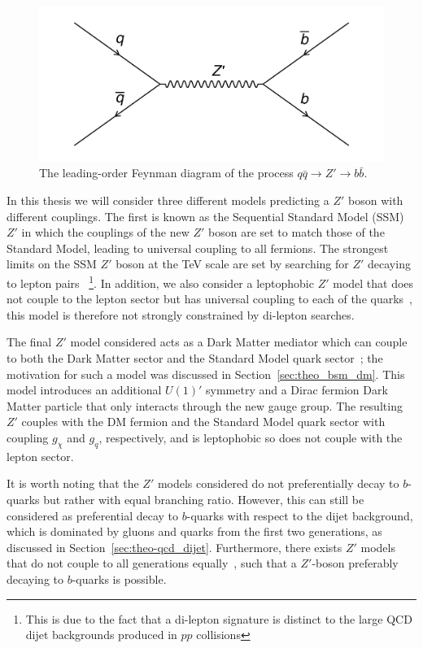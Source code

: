 \begin{figure}[!hbt]
  \begin{center}
    \includegraphics[width=0.7\linewidth, angle=0]{figs/Theory/bsm_zprime.png}
  \end{center}
  \caption{The leading-order Feynman diagram of the process $q\bar{q} \to Z' \to b\bar{b}$.}
  \label{fig:theo-bsm_zprime}
\end{figure}

In this thesis we will consider three different models predicting a $Z'$ boson with different couplings.
The first is known as the Sequential Standard Model (SSM) $Z'$ in which the couplings
of the new $Z'$ boson are set to match those of the Standard Model, leading to universal coupling to all fermions.
The strongest limits on the SSM $Z'$ boson at the TeV scale are set by searching for $Z'$ decaying to lepton pairs~\cite{theo-bsm_dilep}
\footnote{This is due to the fact that a di-lepton signature is distinct to the large QCD dijet backgrounds produced in $pp$ collisions}.
In addition, we also consider a leptophobic $Z'$ model that does not couple to the lepton sector
but has universal coupling to each of the quarks~\cite{theo-bsm_zprime_leptophobic},
this model is therefore not strongly constrained by di-lepton searches.

The final $Z'$ model considered acts as a Dark Matter mediator which can couple to both the Dark Matter sector and the Standard Model quark sector~\cite{theo_bsm-zprime_dm};
the motivation for such a model was discussed in Section~\ref{sec:theo_bsm_dm}.
This model introduces an additional $U(1)'$ symmetry and a Dirac fermion Dark Matter particle that only interacts through the new gauge group.
The resulting $Z'$ couples with the DM fermion and the Standard Model quark sector with coupling $g_\chi$\hspace{0.1mm} and $g_q$\hspace{0.1mm}, respectively,
and is leptophobic so does not couple with the lepton sector.

It is worth noting that the $Z'$ models considered do not preferentially decay to $b$-quarks but rather with equal branching ratio.
However, this can still be considered as preferential decay to $b$-quarks with respect to the dijet background,
which is dominated by gluons and quarks from the first two generations, as discussed in Section~\ref{sec:theo-qcd_dijet}.
Furthermore, there exists $Z'$ models that do not couple to all generations equally~\cite{theo-bsm_zprime_3g},
such that a $Z'$-boson preferably decaying to $b$-quarks is possible.

